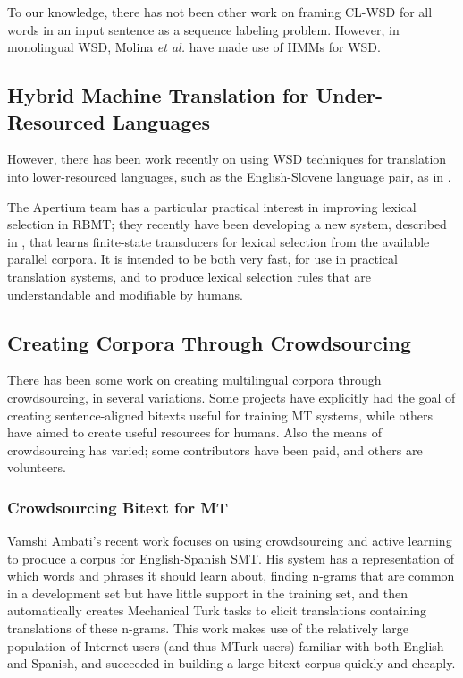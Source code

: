 To our knowledge, there has not been other work on framing CL-WSD for all words
in an input sentence as a sequence labeling problem. However, in monolingual
WSD, Molina \textit{et al.}  have made
use of HMMs for WSD. 


\subsection{Hybrid Machine Translation for Under-Resourced Languages}
However, there has been work recently on using WSD techniques for translation
into lower-resourced languages, such as the English-Slovene language pair, as
in \cite{vintar-fivser-vrvsvcaj:2012:ESIRMT-HyTra2012}. 

The Apertium team has a particular practical interest in improving lexical
selection in RBMT; they recently have been developing
a new system, described in \cite{tyers-fst}, that learns finite-state
transducers for lexical selection from the available parallel corpora. It is
intended to be both very fast, for use in practical translation systems, and
to produce lexical selection rules that are understandable and modifiable by
humans.

\subsection{Creating Corpora Through Crowdsourcing}
There has been some work on creating multilingual corpora through
crowdsourcing, in several variations. Some projects have explicitly had the
goal of creating sentence-aligned bitexts useful for training MT systems, while
others have aimed to create useful resources for humans. Also the means of
crowdsourcing has varied; some contributors have been paid, and others are
volunteers.

\subsubsection{Crowdsourcing Bitext for MT}
Vamshi Ambati's recent work \cite{ambati_naacl,ambati_act} focuses on using
crowdsourcing and active learning to produce a corpus for English-Spanish SMT.
His system has a representation of which words and phrases it should learn
about, finding n-grams that are common in a development set but have little
support in the training set, and then automatically creates Mechanical Turk
tasks to elicit translations containing translations of these n-grams. This
work makes use of the relatively large population of Internet users (and thus
MTurk users) familiar with both English and Spanish, and succeeded in building
a large bitext corpus quickly and cheaply.

